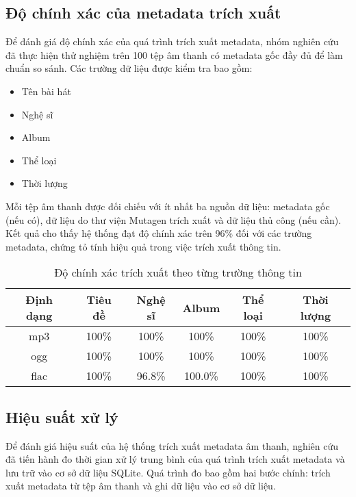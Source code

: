 \documentclass[conference]{IEEEtran}
\begin{document}
\subsection{Độ chính xác của metadata trích xuất}
Để đánh giá độ chính xác của quá trình trích xuất metadata, nhóm nghiên cứu đã thực hiện thử nghiệm trên 100 tệp âm thanh có metadata gốc đầy đủ để làm chuẩn so sánh. Các trường dữ liệu được kiểm tra bao gồm:

\begin{itemize}
    \item Tên bài hát
    \item Nghệ sĩ
    \item Album
    \item Thể loại
    \item Thời lượng
\end{itemize}

Mỗi tệp âm thanh được đối chiếu với ít nhất ba nguồn dữ liệu: metadata gốc (nếu có), dữ liệu do thư viện Mutagen trích xuất và dữ liệu thủ công (nếu cần). Kết quả cho thấy hệ thống đạt độ chính xác trên 96\% đối với các trường metadata, chứng tỏ tính hiệu quả trong việc trích xuất thông tin.

\begin{table}[H]
    \centering
    \caption{Độ chính xác trích xuất theo từng trường thông tin}
    \begin{tabular}{|c|c|c|c|c|c|}
    \hline
    \textbf{Định dạng} & \textbf{Tiêu đề} & \textbf{Nghệ sĩ} & \textbf{Album} & \textbf{Thể loại} & \textbf{Thời lượng} \\
    \hline
    mp3 & 100\% & 100\% & 100\% & 100\% & 100\% \\
    ogg & 100\% & 100\% & 100\% & 100\% & 100\% \\
    flac & 100\% & 96.8\% & 100.0\% & 100\% & 100\% \\
    \hline
    \end{tabular}
\end{table}

\subsection{Hiệu suất xử lý}

Để đánh giá hiệu suất của hệ thống trích xuất metadata âm thanh, nghiên cứu đã tiến hành đo thời gian xử lý trung bình của quá trình trích xuất metadata và lưu trữ vào cơ sở dữ liệu SQLite. Quá trình đo bao gồm hai bước chính: trích xuất metadata từ tệp âm thanh và ghi dữ liệu vào cơ sở dữ liệu.
\end{document}
